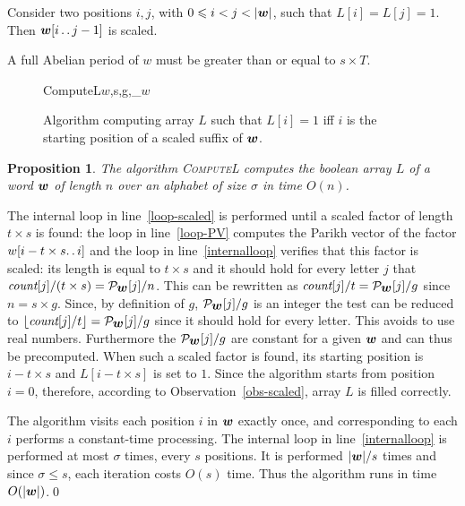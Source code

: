 \documentclass[3p]{elsarticle}
\def\pp{\mathinner{\ldotp\ldotp}}
\def\PVW{\mathcal{P}_{\s{w}}}
\def\myCount{\textit{count}}
\newtheorem{prop}[thm]{Proposition}
\def\s#1{\mbox{\boldmath $#1$}}
\begin{document}
\begin{obs}
\label{obs-fact}
Consider two positions $i,j$, with $0\leqslant i<j<|\s{w}|$, such that $L[i]=L[j]=1$. Then $\s{w}[i\pp j-1]$ is scaled.
\end{obs}

\begin{obs}
\label{obs-T}
A full Abelian period of $w$ must be greater than or equal to $s\times T$.
\end{obs}

\begin{figure}
\begin{algo}[numcom]{ComputeL}{\s{w},s,g,\PVW}
  \SET{(i,T,L)}{(0,0,0^{|\s{w}|})}
  \DOWHILE{i\leqslant|\s{w}|-s}
    \SET{\myCount}{0^{\sigma}}
    \label{loop-scaled}
      \label{loop-PV}
        \INCR{\myCount[w[i]]}
      \OD
      \label{internalloop}
      \DOWHILE{j<\sigma \AND \lfloor \myCount[j]/t\rfloor=\PVW[j]/g}
      \OD
    \OD
  \OD  
\end{algo}
\caption{\label{algo-computel}Algorithm computing 
array $L$ such that $L[i]=1$ iff $i$ is the starting position of a scaled
suffix of $\s{w}$.
}
\end{figure}

\begin{prop}
The algorithm \textsc{ComputeL} computes the boolean array $L$ of a word $\s{w}$
 of length $n$
 over an alphabet of size $\sigma$ in time $O(n)$.
\end{prop}

\begin{pf}
The internal loop in line~\ref{loop-scaled} is performed until a scaled factor
 of length $t\times s$ is found: the loop in line~\ref{loop-PV} computes the Parikh vector of
 the factor $w[i-t\times s\ldotp\ldotp i]$ and the loop in line~\ref{internalloop} verifies that this
 factor is scaled: its length is equal to $t\times s$ and it should hold for every letter $j$
 that $\myCount[j]/(t\times s)=\PVW[j]/n$.
This can be rewritten as $\myCount[j]/t=\PVW[j]/g$ since $n=s\times g$.
Since, by definition of $g$, $\PVW[j]/g$ is an integer the test can be reduced to
 $\lfloor \myCount[j]/t \rfloor=\PVW[j]/g$ since it should hold for every letter.
This avoids to use real numbers.
Furthermore the $\PVW[j]/g$ are constant for a given $\s{w}$ and can thus be 
 precomputed.
When such a scaled factor is found, its starting position is $i-t\times s$
 and $L[i-t\times s]$ is set to $1$. Since the algorithm starts from 
 position $i=0$, therefore, according to Observation~\ref{obs-scaled}, array $L$ is filled correctly.

The algorithm visits each position $i$ in $\s{w}$ exactly once,
 and corresponding to each $i$ performs a constant-time processing.
The internal loop in line~\ref{internalloop} is performed at most $\sigma$
 times, every $s$ positions.
It is performed $|\s{w}|/s$ times and since $\sigma\leqslant s$, each
 iteration costs $O(s)$ time.
Thus the algorithm runs in time $O(|\s{w}|)$.\qed
\end{pf}
\end{document}
